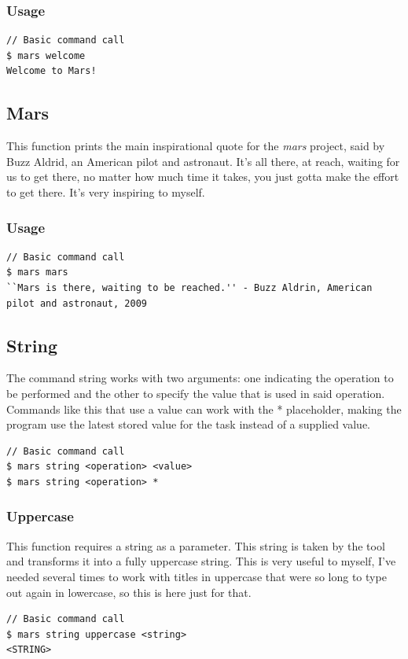 \documentclass{report}
\begin{document}
\subsubsection{Usage}
\begin{lstlisting}
// Basic command call
$ mars welcome
Welcome to Mars!
\end{lstlisting}

\subsection{Mars}
This function prints the main inspirational quote for the \emph{mars} project, said by Buzz Aldrid, an American pilot and astronaut. It's all there, at reach, waiting for us to get there, no matter how much time it takes, you just gotta make the effort to get there. It's very inspiring to myself.
\subsubsection{Usage}
\begin{lstlisting}
// Basic command call
$ mars mars
``Mars is there, waiting to be reached.'' - Buzz Aldrin, American pilot and astronaut, 2009
\end{lstlisting}

\subsection{String}
The command string works with two arguments: one indicating the operation to be performed and the other to specify the value that is used in said operation. Commands like this that use a value can work with the * placeholder, making the program use the latest stored value for the task instead of a supplied value.
\begin{lstlisting}
// Basic command call
$ mars string <operation> <value>
$ mars string <operation> *
\end{lstlisting}

\subsubsection{Uppercase}
This function requires a string as a parameter. This string is taken by the tool and transforms it into a fully uppercase string. This is very useful to myself, I've needed several times to work with titles in uppercase that were so long to type out again in lowercase, so this is here just for that.
\begin{lstlisting}
// Basic command call
$ mars string uppercase <string>
<STRING>
\end{lstlisting}
\end{document}
